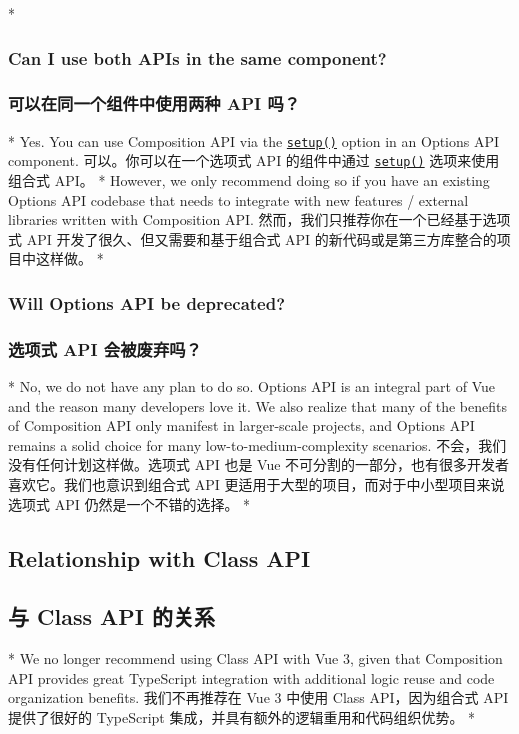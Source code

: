 \begin{paracol}{2} 
 
\switchcolumn[0]*%
\subsubsection{Can I use both APIs in the same component?}
\switchcolumn
\subsubsection{可以在同一个组件中使用两种 API 吗？}
\switchcolumn[0]*%
Yes. You can use Composition API via the
\href{https://vuejs.org/api/composition-api-setup.html}{\texttt{setup()}}
option in an Options API component.
\switchcolumn
可以。你可以在一个选项式 API 的组件中通过
\href{https://cn.vuejs.org/api/composition-api-setup.html}{\texttt{setup()}}
选项来使用组合式 API。
\switchcolumn[0]*%
However, we only recommend doing so if you have an existing Options API
codebase that needs to integrate with new features / external libraries
written with Composition API.
\switchcolumn
然而，我们只推荐你在一个已经基于选项式 API
开发了很久、但又需要和基于组合式 API
的新代码或是第三方库整合的项目中这样做。
\switchcolumn[0]*%
\subsubsection{Will Options API be deprecated?}
\switchcolumn
\subsubsection{选项式 API 会被废弃吗？}
\switchcolumn[0]*%
No, we do not have any plan to do so. Options API is an integral part of
Vue and the reason many developers love it. We also realize that many of
the benefits of Composition API only manifest in larger-scale projects,
and Options API remains a solid choice for many low-to-medium-complexity
scenarios.
\switchcolumn
不会，我们没有任何计划这样做。选项式 API 也是 Vue
不可分割的一部分，也有很多开发者喜欢它。我们也意识到组合式 API
更适用于大型的项目，而对于中小型项目来说选项式 API
仍然是一个不错的选择。
\switchcolumn[0]*%
\subsection{Relationship with Class API}
\switchcolumn
\subsection{与 Class API 的关系}
\switchcolumn[0]*%
We no longer recommend using Class API with Vue 3, given that
Composition API provides great TypeScript integration with additional
logic reuse and code organization benefits.
\switchcolumn
我们不再推荐在 Vue 3 中使用 Class API，因为组合式 API 提供了很好的
TypeScript 集成，并具有额外的逻辑重用和代码组织优势。
\switchcolumn[0]*%

\end{paracol}
